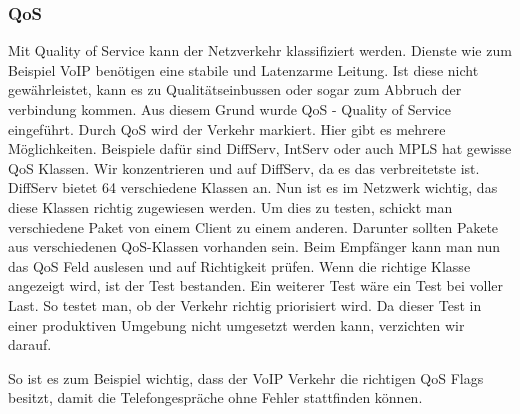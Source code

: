 \documentclass[a4,12pt]{scrartcl}
\begin{document}
\subsubsection{QoS}
Mit Quality of Service kann der Netzverkehr klassifiziert werden. Dienste wie zum Beispiel VoIP benötigen eine stabile und Latenzarme Leitung. Ist diese nicht gewährleistet, kann es zu Qualitätseinbussen oder sogar zum Abbruch der verbindung kommen. Aus diesem Grund wurde QoS - Quality of Service eingeführt. Durch QoS wird der Verkehr markiert. Hier gibt es mehrere Möglichkeiten. Beispiele dafür sind DiffServ, IntServ oder auch MPLS hat gewisse QoS Klassen. Wir konzentrieren und auf DiffServ, da es das verbreitetste ist.\newline\newline
DiffServ bietet 64 verschiedene Klassen an. Nun ist es im Netzwerk wichtig, das diese Klassen richtig zugewiesen werden. Um dies zu testen, schickt man verschiedene Paket von einem Client zu einem anderen. Darunter sollten Pakete aus verschiedenen QoS-Klassen vorhanden sein. Beim Empfänger kann man nun das QoS Feld auslesen und auf Richtigkeit prüfen. Wenn die richtige Klasse angezeigt wird, ist der Test bestanden.\newline
Ein weiterer Test wäre ein Test bei voller Last. So testet man, ob der Verkehr richtig priorisiert wird. Da dieser Test in einer produktiven Umgebung nicht umgesetzt werden kann, verzichten wir darauf.



So ist es zum Beispiel wichtig, dass der VoIP Verkehr die richtigen QoS Flags besitzt, damit die Telefongespräche ohne Fehler stattfinden können. 
\end{document}
